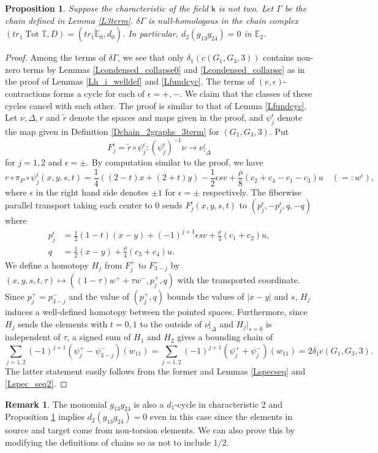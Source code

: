 \documentclass[reqno]{amsart}
\theoremstyle{definition}
\newtheorem{rem}[defi]{Remark}
\theoremstyle{plain}
\newtheorem{prop}[defi]{Proposition}
\newcommand{\eps}{\epsilon}
\newcommand{\CEE}{\check{\mathbb{E}}}
\newcommand{\tot}{\operatorname{Tot}}%
\newcommand{\EE}{\mathbb{E}}
\newcommand{\kk}{\mathsf{k}}
\begin{document}
\begin{prop}\label{Pd2_ch3}
Suppose  the characteristic of the field $\kk$ is not two. Let $\Gamma$ be the chain defined in Lemma \ref{L3term}. $\delta\Gamma$ is  null-homologous in the chain complex $(tr_1\tot\mathbb{T}, D)=(tr_1\CEE_0,d_0)$. In particular, $d_2(g_{13}g_{24})=0$ in $\EE_2$. 
\end{prop}
\begin{proof}
Among the terms of $\delta\Gamma$,  we see that only  $\delta_1(c(G_1,G_3,3))$ contains non-zero terms by Lemmas \ref{Lcondensed_collapse0} and \ref{Lcondensed_collapse} as in the proof of Lemmas \ref{Lh_i_welldef} and \ref{Lfundcyc}. The terms of  $(e,\eps)$-contractions  forms a cycle for each of $\eps=+,-$. We claim that the  classes of these cycles  cancel with each other. The proof  is similar to that of Lemma \ref{Lfundcyc}. Let $\nu, \Delta, r$ and $\tilde r$ denote the spaces and maps given in the proof, and $\psi^\eps_j$ denote the map given in Definition \ref{Dchain_2graphs_3term} for $(G_1,G_3,3)$. Put
\[
F^\eps_j=\tilde r\circ \psi_j^\eps: (\psi_j^\eps)^{-1}\nu\to \nu|_\Delta
\]
for $j=1,2$ and $\eps=\pm$. By computation similar to the proof, we have
\[
r\circ\pi_P\circ \psi^\eps_j(x,y,s,t)=\frac{1}{4}((2-t)x+(2+t)y)-\frac{1}{2}\eps sv+\frac{\rho}{8}(c_2+c_4-c_1-c_3)u\quad  (=:w^\eps),
\]
where $\eps$ in the right hand side denotes $\pm 1$ for $\eps=\pm$ respectively. The fiberwise parallel transport taking each center to $0$ sends $F_j^\eps(x,y,s,t)$ to $(p_j^\eps,-p_j^\eps,q,-q)$ where
\[
\begin{split}
p_j^\eps&=\frac{1}{2}(1-t)(x-y)+(-1)^{j+1}\eps sv+\frac{\rho}{4}(c_1+c_2)u, \\
q&=\frac{1}{2}(x-y)+\frac{\rho}{4}(c_3+c_4)u.
\end{split}
\] 
We define a homotopy $H_j$ from $F_j^+$ to $F_{3-j}^-$ by  $(x,y,s,t,\tau)\mapsto ((1-\tau)w^++\tau w^-,p_j^+,q)$ with the transported coordinate. Since $p^+_j=p^-_{3-j}$ and the value of  $(p_j^+,q)$ bounds the values of $|x-y|$ and $s$,  $H_j$ induces a well-defined homotopy between the pointed spaces. Furthermore, 
since $H_j$ sends the elements with $t=0,1$ to the outside of $\nu|_\Delta$ and $H_j|_{s=0}$ is independent of $\tau$, a signed sum of $H_1$ and $H_2$ gives a bounding chain 
of 
\[
\sum_{j=1,2}(-1)^{j+1}(\psi^+_j-\psi^-_{3-j})(w_{11})=\sum_{j=1,2}(-1)^{j+1}(\psi^+_j+\psi^-_{j})(w_{11})=2\delta_1c(G_1,G_3,3).
\] The latter statement easily follows from the former  and Lemmas \ref{Lspecseq} and \ref{Lspec_seq2}.
\end{proof}
\begin{rem}\label{R3term_ch2}
The monomial $g_{13}g_{24}$ is also a $d_1$-cycle in  characteristic 2 and Proposition \ref{Pd2_ch3} implies  $d_2(g_{13}g_{24})=0$ even in this case since the elements in  source and target come from non-torsion elements. We can also prove this  by modifying the definitions of chains so as not to include $1/2$. 
\end{rem}
\end{document}
